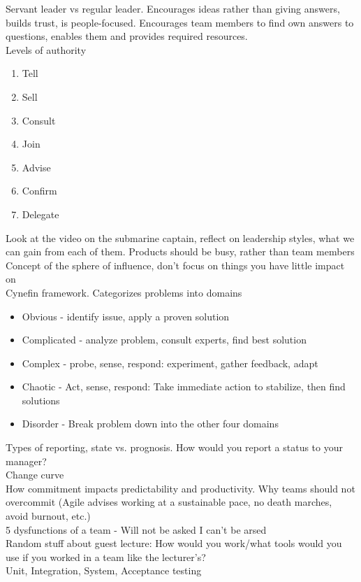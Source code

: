 \documentclass[10pt]{article}
\begin{document}
Servant leader vs regular leader. Encourages ideas rather than giving answers, builds trust, is people-focused. Encourages team members to find own answers to questions, enables them and provides required resources.\\
Levels of authority
\begin{enumerate}
\item Tell
\item Sell
\item Consult
\item Join
\item Advise
\item Confirm
\item Delegate
\end{enumerate}
Look at the video on the submarine captain, reflect on leadership styles, what we can gain from each of them. Products should be busy, rather than team members \\
Concept of the sphere of influence, don't focus on things you have little impact on\\
Cynefin framework. Categorizes problems into domains
\begin{itemize}
\item Obvious - identify issue, apply a proven solution
\item Complicated - analyze problem, consult experts, find best solution
\item Complex - probe, sense, respond: experiment, gather feedback, adapt
\item Chaotic - Act, sense, respond: Take immediate action to stabilize, then find solutions
\item Disorder - Break problem down into the other four domains
\end{itemize}
Types of reporting, state vs. prognosis. How would you report a status to your manager?\\
Change curve\\
How commitment impacts predictability and productivity. Why teams should not overcommit (Agile advises working at a sustainable pace, no death marches, avoid burnout, etc.)\\
5 dysfunctions of a team - Will not be asked I can't be arsed\\
Random stuff about guest lecture: How would you work/what tools would you use if you worked in a team like the lecturer's?\\
Unit, Integration, System, Acceptance testing
\end{document}
